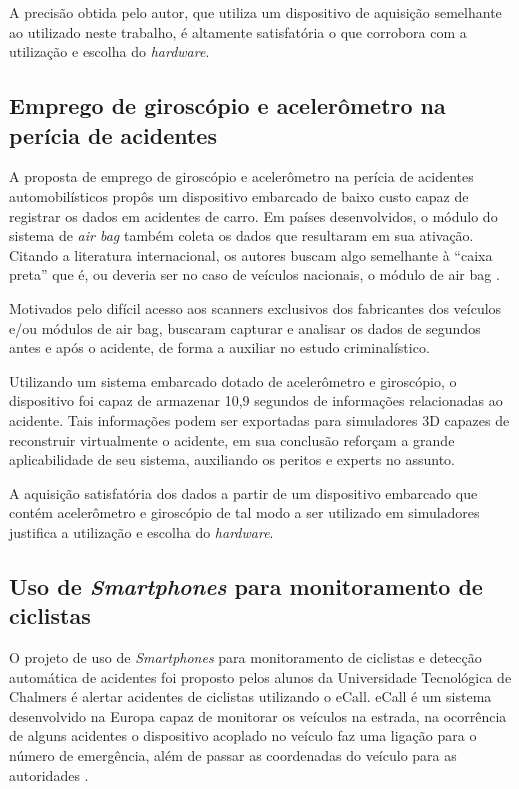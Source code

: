 A precisão obtida pelo autor, que utiliza um dispositivo de aquisição semelhante ao utilizado neste trabalho, é altamente satisfatória o que corrobora com a utilização e escolha do \textit{hardware}.  



\subsection{\textbf{Emprego de giroscópio e acelerômetro na perícia de acidentes}}

A proposta de emprego de giroscópio e acelerômetro na perícia de acidentes automobilísticos propôs um dispositivo embarcado de baixo custo capaz de registrar os dados em acidentes de carro. Em países desenvolvidos, o módulo do sistema de \textit{air bag} também coleta os dados que resultaram em sua ativação. Citando a literatura internacional, os autores buscam algo semelhante à “caixa preta” que é, ou deveria ser no caso de veículos nacionais, o módulo de air bag \cite{lima2016proposta}.

Motivados pelo difícil acesso aos scanners exclusivos dos fabricantes dos veículos e/ou módulos de air bag, buscaram capturar e analisar os dados de segundos antes e após o acidente, de forma a auxiliar no estudo criminalístico. 

Utilizando um sistema embarcado dotado de acelerômetro e giroscópio, o dispositivo foi capaz de armazenar 10,9 segundos de informações relacionadas ao acidente. Tais informações podem ser exportadas para simuladores 3D capazes de reconstruir virtualmente o acidente, em sua conclusão reforçam a grande aplicabilidade de seu sistema, auxiliando os peritos e experts no assunto. 

A aquisição satisfatória dos dados a partir de um dispositivo embarcado que contém acelerômetro e giroscópio de tal modo a ser utilizado em simuladores justifica a utilização e escolha do \textit{ hardware}.



\subsection{\textbf{Uso de \textit{Smartphones} para monitoramento de ciclistas}}

 O projeto  de uso de \textit{Smartphones} para monitoramento de ciclistas e detecção automática de acidentes foi proposto pelos alunos da Universidade Tecnológica de Chalmers é alertar acidentes de ciclistas utilizando o eCall. eCall é um sistema desenvolvido na Europa capaz de monitorar os veículos na estrada, na ocorrência de alguns acidentes o dispositivo acoplado no veículo faz uma ligação para o número de emergência, além de passar as coordenadas do veículo para as autoridades \cite{2019interoperable}.

